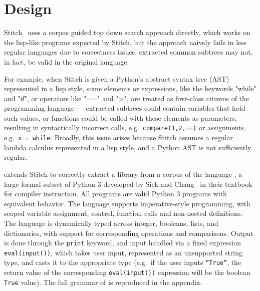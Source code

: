 \section{Design}
\label{sec:design}
Stitch~\cite{Bowers_2023stitch} uses a corpus guided top down search approach directly, which works on the lisp-like programs expected by Stitch, but the approach naively fails in less regular languages due to correctness issues: extracted common subtrees may not, in fact, be valid in the original language.

For example, when Stitch is given a Python's abstract syntax tree (AST) represented in a lisp style, 
some elements or expressions, like the keywords "while" and "if", or operators like "==" and ">", are treated as first-class citizens of the programming language --- extracted subtrees could contain variables that hold such values, or functions could be called with these elements as parameters, resulting in syntactically incorrect calls, 
e.g.\ \texttt{compare(1,2,==)} or assignments, e.g.\ \texttt{x = while}.
Broadly, this issue arises because Stitch assumes a regular lambda calculus represented in a lisp style, and a Python AST is not sufficiently regular. 

\toolname{} extends Stitch to correctly extract a library from a corpus of the language \ptwo{}, a large formal subset of Python 3 developed by Siek and Chang~\cite{pythonbook} in their textbook for compiler instruction. All \ptwo{} programs are valid Python 3 programs with equivalent behavior.  The \ptwo{} language supports imperative-style programming, with scoped variable assignment, control, function calls and non-nested definitions.  The language is dynamically typed across integer, booleans, lists, and dictionaries, with support for corresponding operations and comparisons.  Output is done through the \texttt{print} keyword, and input handled via a fixed expression \texttt{eval(input())}, which takes user input, represented as an unsupported string type, and casts it to the appropriate type (e.g.\  if the user inputs \texttt{``True''}, the return value of the corresponding \texttt{eval(input())} expression will be the boolean \texttt{True} value).  The full grammar of \ptwo{} is reproduced in the appendix.

